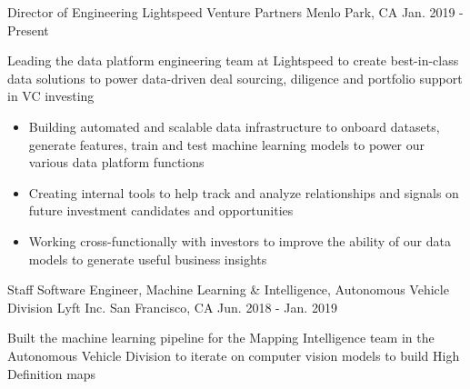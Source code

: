 

\begin{cventries}

  \cventry
    {Director of Engineering} %
    {Lightspeed Venture Partners} %
    {Menlo Park, CA} %
    {Jan. 2019 - Present} %
    {
      \begin{cvitems} %
        \item{Leading the data platform engineering team at Lightspeed to create best-in-class data solutions to power data-driven deal sourcing, diligence and portfolio support in VC investing}
        \begin{itemize}[label=$\circ$]
          \item{Building automated and scalable data infrastructure to onboard datasets, generate features, train and test machine learning models to power our various data platform functions}
          \item{Creating internal tools to help track and analyze relationships and signals on future investment candidates and opportunities}
          \item{Working cross-functionally with investors to improve the ability of our data models to generate useful business insights}
        \end{itemize}
      \end{cvitems}
    }

  \cventry
    {Staff Software Engineer, Machine Learning \& Intelligence, Autonomous Vehicle Division} %
    {Lyft Inc.} %
    {San Francisco, CA} %
    {Jun. 2018 - Jan. 2019} %
    {
      \begin{cvitems} %
        \item{Built the machine learning pipeline for the Mapping Intelligence team in the Autonomous Vehicle Division to iterate on computer vision models to build High Definition maps}
      \end{cvitems}
    }


\end{cventries}
